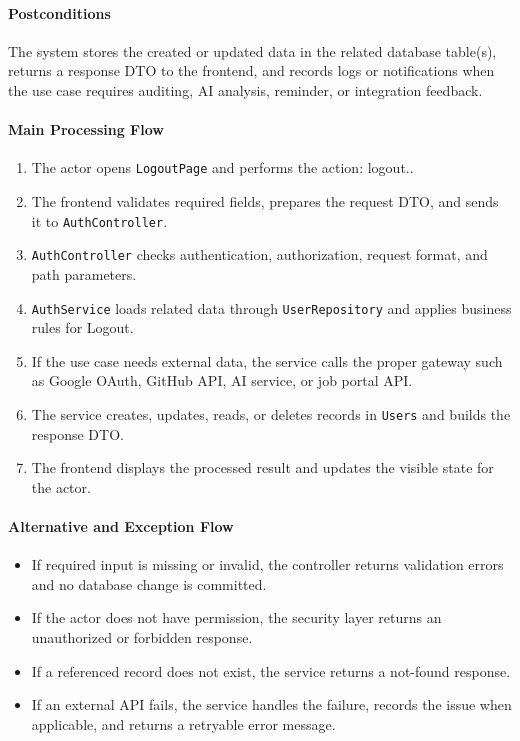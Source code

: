 \paragraph{Postconditions}

The system stores the created or updated data in the related database table(s), returns a response DTO to the frontend, and records logs or notifications when the use case requires auditing, AI analysis, reminder, or integration feedback.

\paragraph{Main Processing Flow}

\begin{enumerate}
    \item The actor opens \texttt{LogoutPage} and performs the action: logout..
    \item The frontend validates required fields, prepares the request DTO, and sends it to \texttt{AuthController}.
    \item \texttt{AuthController} checks authentication, authorization, request format, and path parameters.
    \item \texttt{AuthService} loads related data through \texttt{UserRepository} and applies business rules for Logout.
    \item If the use case needs external data, the service calls the proper gateway such as Google OAuth, GitHub API, AI service, or job portal API.
    \item The service creates, updates, reads, or deletes records in \texttt{Users} and builds the response DTO.
    \item The frontend displays the processed result and updates the visible state for the actor.
\end{enumerate}

\paragraph{Alternative and Exception Flow}

\begin{itemize}
    \item If required input is missing or invalid, the controller returns validation errors and no database change is committed.
    \item If the actor does not have permission, the security layer returns an unauthorized or forbidden response.
    \item If a referenced record does not exist, the service returns a not-found response.
    \item If an external API fails, the service handles the failure, records the issue when applicable, and returns a retryable error message.
\end{itemize}

